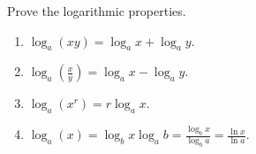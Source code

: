 \begin{frame}
\begin{example}
Prove the logarithmic properties. 
\begin{enumerate}
\item  $\log_a (xy) = \log_a x + \log_a y$.
\item  $\log_a \left( \frac{x}{y}\right) = \log_a x - \log_a y$.
\item  $\log_a (x^r) = r\log_a x$.
\item  $\log_{a}(x)=\log_b x \log_{a} b=\frac{\log_b x}{\log_{b} a}=  \frac{\ln x}{\ln a}$.
\end{enumerate}

\end{example}

\end{frame}
